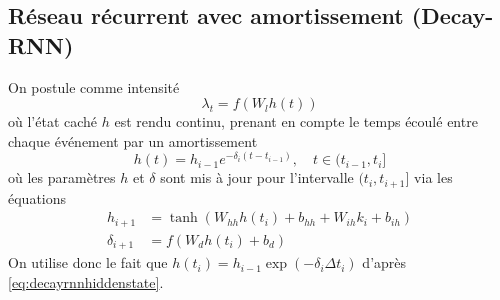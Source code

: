 \documentclass[11pt]{article}
\begin{document}
\subsection{Réseau récurrent avec amortissement (Decay-RNN)}

On postule comme intensité
\begin{equation}\label{eq:decayrnnhiddenstate}
	\lambda_t = f(W_l h(t))
\end{equation}
où l'état caché $h$ est rendu continu, prenant en compte le temps écoulé entre chaque événement par un amortissement
\begin{equation}
	h(t) = h_{i-1}e^{-\delta_i(t-t_{i-1})},\quad t\in(t_{i-1},t_i]
\end{equation}
où les paramètres $h$ et $\delta$ sont mis à jour pour l'intervalle $(t_i,t_{i+1}]$ via les équations
\begin{align}
	h_{i+1} &= \tanh(W_{hh}h(t_i) + b_{hh} + W_{ih}k_i + b_{ih}) \\
	\delta_{i+1} &= f(W_dh(t_i) + b_d)
\end{align}
On utilise donc le fait que $h(t_i) = h_{i-1}\exp(-\delta_i\Delta t_i)$ d'après \eqref{eq:decayrnnhiddenstate}.
\end{document}
